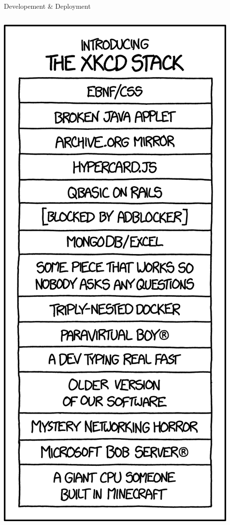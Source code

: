 \documentclass[10pt,graphics,aspectratio=169,table]{beamer}
\begin{document}
\begin{frame}{Developement \& Deployment}
\begin{columns}
        \includegraphics[height=0.75\paperheight]{img/stack} \cite{stack}
\end{columns}
\end{frame}
\end{document}
